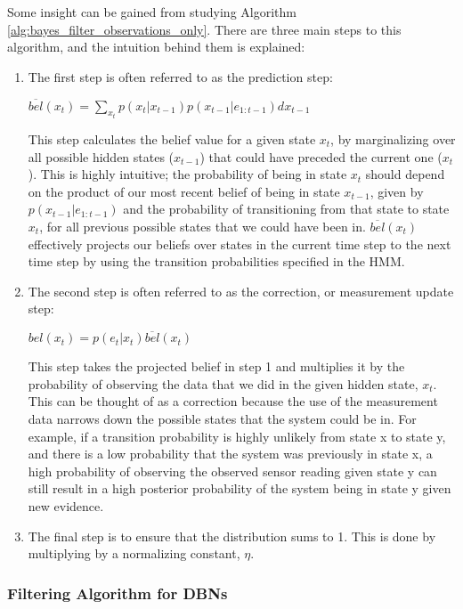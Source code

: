 Some insight can be gained from studying Algorithm \ref{alg:bayes_filter_observations_only}. There are three main steps to this algorithm, and the intuition behind them is explained: 
\begin{enumerate}
    
    \item The first step is often referred to as the prediction step:
    \begin{center}
    $\overline{bel}(x_t) = \sum_{x_t} p(x_t | x_{t-1}) p(x_{t-1} | e_{1:t-1}) d x_{t-1}$
    \end{center}
    This step calculates the belief value for a given state $x_t$, by marginalizing over all possible hidden states ($x_{t-1}$) that could have preceded the current one ($x_t$). This is highly intuitive; the probability of being in state $x_t$ should depend on the product of our most recent belief of being in state $x_{t-1}$, given by $p(x_{t-1} | e_{1:t-1})$ and the probability of transitioning from that state to state $x_{t}$, for all previous possible states that we could have been in. 
    $\overline{bel}(x_t)$ effectively projects our beliefs over states in the current time step to the next time step by using the transition probabilities specified in the HMM.
    
    \item The second step is often referred to as the correction, or measurement update step: 
    \begin{center}
    $bel(x_t) = p(e_t | x_t) \overline{bel}(x_t)$ 
    \end{center}
    This step takes the projected belief in step 1 and multiplies it by the probability of observing the data that we did in the given hidden state, $x_t$. This can be thought of as a correction because the use of the measurement data narrows down the possible states that the system could be in. 
    For example, if a transition probability is highly unlikely from state x to state y, and there is a low probability that the system was previously in state x, a high probability of observing the observed sensor reading given state y can still result in a high posterior probability of the system being in state y given new evidence.
    
    \item The final step is to ensure that the distribution sums to 1. This is done by multiplying by a normalizing constant, $\eta$.
    
    
\end{enumerate}





\subsubsection{Filtering Algorithm for DBNs}